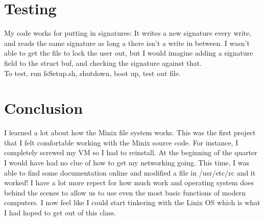 \documentclass[a4paper, 12pt]{article}
\begin{document}
\section{Testing}
My code works for putting in signatures: It writes a new signature every write, and reads the same signature as long a there isn't a write in between. I wasn't able to get the file to lock the user out, but I would imagine adding a signature field to the struct buf, and checking the signature against that.\\
To test, run fsSetup.sh, shutdown, boot up, test out file.\\

\section{Conclusion}
I learned a lot about how the Minix file system works. This was the first project that I felt comfortable working with the Minix source code. For instance, I completely screwed my VM so I had to reinstall. At the beginning of the quarter I would have had no clue of how to get my networking going. This time, I was able to find some documentation online and modified a file in /usr/etc/rc and it worked! I have a lot more repect for how much work and operating system does behind the scenes to allow us to use even the most basic functions of modern computers. I now feel like I could start tinkering with the Linix OS which is what I had hoped to get out of this class.\\ 

      
      
      
    
\end{document}
